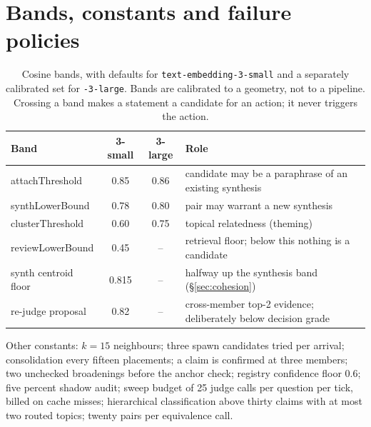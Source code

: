 \documentclass{article}
\begin{document}
\section{Bands, constants and failure policies}
\label{app:bands}
\begin{table}[h]
\centering\scriptsize
\caption{Cosine bands, with defaults for \texttt{text-embedding-3-small} and a separately calibrated set for \texttt{-3-large}. Bands are calibrated to a geometry, not to a pipeline. Crossing a band makes a statement a candidate for an action; it never triggers the action.}
\begin{tabular}{lccl}
\toprule
Band & 3-small & 3-large & Role \\
\midrule
attachThreshold & 0.85 & 0.86 & candidate may be a paraphrase of an existing synthesis \\
synthLowerBound & 0.78 & 0.80 & pair may warrant a new synthesis \\
clusterThreshold & 0.60 & 0.75 & topical relatedness (theming) \\
reviewLowerBound & 0.45 & -- & retrieval floor; below this nothing is a candidate \\
synth centroid floor & 0.815 & -- & halfway up the synthesis band (\S\ref{sec:cohesion}) \\
re-judge proposal & 0.82 & -- & cross-member top-2 evidence; deliberately below decision grade \\
\bottomrule
\end{tabular}
\end{table}
Other constants: $k=15$ neighbours; three spawn candidates tried per arrival; consolidation every fifteen placements; a claim is confirmed at three members; two unchecked broadenings before the anchor check; registry confidence floor 0.6; five percent shadow audit; sweep budget of 25 judge calls per question per tick, billed on cache misses; hierarchical classification above thirty claims with at most two routed topics; twenty pairs per equivalence call.
\end{document}
